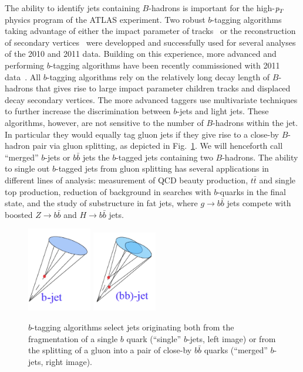 The ability to identify jets containing $B$-hadrons is important for the high-${\emph{p}_{T}}$ physics program of the ATLAS experiment. Two robust $b$-tagging algorithms taking
advantage of either the impact parameter of tracks~\cite{ATLAS-CONF-2010-091} or the reconstruction of secondary vertices~\cite{ATLAS-CONF-2010-042} were developped and successfully used for several analyses of the 2010 and 2011 data. Building on this experience, more advanced and performing $b$-tagging algorithms have been recently commissioned with 2011 data~\cite{ATLAS-CONF-2011-102}.
All $b$-tagging algorithms rely on the relatively long decay length of $B$-hadrons that gives rise to large impact parameter children tracks and displaced decay secondary vertices. The more advanced taggers %
use multivariate techniques %
to further increase the discrimination between $b$-jets and light jets.
These algorithms, however, are not sensitive to the number of $B$-hadrons within the jet. In particular they would equally tag gluon jets if they give rise to a close-by $B$-hadron pair via gluon splitting, as depicted in Fig.~\ref{fig:gbbcartoon}. We will henceforth call ``merged'' $b$-jets or $b\bar{b}$ jets the $b$-tagged jets containing two $B$-hadrons. The ability to single out $b$-tagged jets from gluon splitting has several applications in different lines of analysis: measurement of QCD beauty production, $t\bar{t}$ and single top production, reduction of background in searches with $b$-quarks in the final state, and the study of substructure in fat jets, where $g\rightarrow b\bar{b}$ jets compete with boosted $Z\rightarrow b\bar{b}$ and $H\rightarrow b\bar{b}$ jets.
\begin{figure}[h]
\centering
\includegraphics[width=0.25\textwidth]{FIGS/Single_b.png}
\hspace{1cm}
\includegraphics[width=0.25\textwidth]{FIGS/Merged_bb.png}
  \caption{$b$-tagging algorithms select jets originating both from the fragmentation of a single $b$ quark (``single'' $b$-jets, left image) or from the splitting of a gluon into a pair of close-by $b \bar{b}$ quarks (``merged'' $b$-jets, right image).}
  \label{fig:gbbcartoon}
\end{figure}


